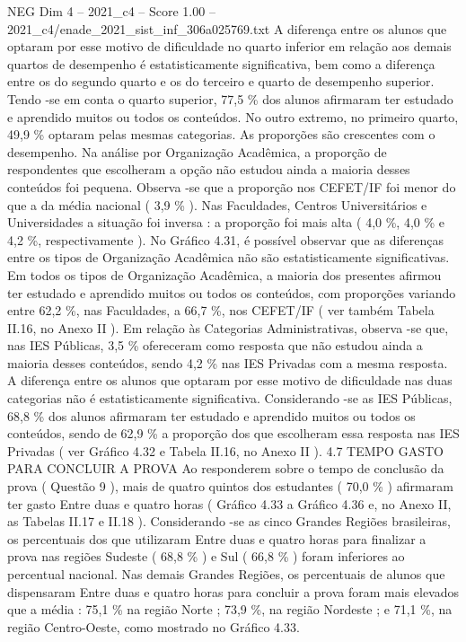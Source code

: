 \begin{textsample}{NEG Dim 4 – 2021\_c4 – Score 1.00 – 2021\_c4/enade\_2021\_sist\_inf\_306a025769.txt}
A diferença entre os alunos que optaram por esse motivo de dificuldade no quarto inferior em relação aos demais quartos de desempenho é estatisticamente significativa, bem como a diferença entre os do segundo quarto e os do terceiro e quarto de desempenho superior.
Tendo -se em conta o quarto superior, 77,5 \% dos alunos afirmaram ter estudado e aprendido muitos ou todos os conteúdos.
No outro extremo, no primeiro quarto, 49,9 \% optaram pelas mesmas categorias.
As proporções são crescentes com o desempenho.
Na análise por Organização Acadêmica, a proporção de respondentes que escolheram a opção não estudou ainda a maioria desses conteúdos foi pequena.
Observa -se que a proporção nos CEFET/IF foi menor do que a da média nacional ( 3,9 \% ).
Nas Faculdades, Centros Universitários e Universidades a situação foi inversa : a proporção foi mais alta ( 4,0 \%, 4,0 \% e 4,2 \%, respectivamente ).
No Gráfico 4.31, é possível observar que as diferenças entre os tipos de Organização Acadêmica não são estatisticamente significativas.
Em todos os tipos de Organização Acadêmica, a maioria dos presentes afirmou ter estudado e aprendido muitos ou todos os conteúdos, com proporções variando entre 62,2 \%, nas Faculdades, a 66,7 \%, nos CEFET/IF ( ver também Tabela II.16, no Anexo II ).
Em relação às Categorias Administrativas, observa -se que, nas IES Públicas, 3,5 \% ofereceram como resposta que não estudou ainda a maioria desses conteúdos, sendo 4,2 \% nas IES Privadas com a mesma resposta.
A diferença entre os alunos que optaram por esse motivo de dificuldade nas duas categorias não é estatisticamente significativa.
Considerando -se as IES Públicas, 68,8 \% dos alunos afirmaram ter estudado e aprendido muitos ou todos os conteúdos, sendo de 62,9 \% a proporção dos que escolheram essa resposta nas IES Privadas ( ver Gráfico 4.32 e Tabela II.16, no Anexo II ). 4.7 TEMPO GASTO PARA CONCLUIR A PROVA Ao responderem sobre o tempo de conclusão da prova ( Questão 9 ), mais de quatro quintos dos estudantes ( 70,0 \% ) afirmaram ter gasto Entre duas e quatro horas ( Gráfico 4.33 a Gráfico 4.36 e, no Anexo II, as Tabelas II.17 e II.18 ).
Considerando -se as cinco Grandes Regiões brasileiras, os percentuais dos que utilizaram Entre duas e quatro horas para finalizar a prova nas regiões Sudeste ( 68,8 \% ) e Sul ( 66,8 \% ) foram inferiores ao percentual nacional.
Nas demais Grandes Regiões, os percentuais de alunos que dispensaram Entre duas e quatro horas para concluir a prova foram mais elevados que a média : 75,1 \% na região Norte ; 73,9 \%, na região Nordeste ; e 71,1 \%, na região Centro-Oeste, como mostrado no Gráfico 4.33.

\end{textsample}
